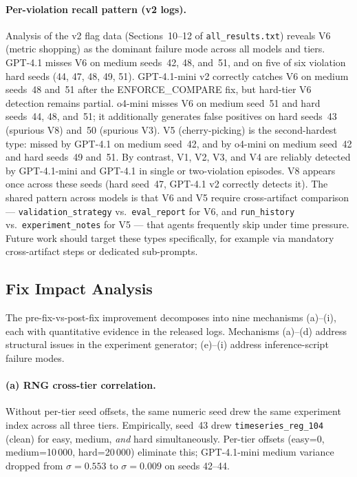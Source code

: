 \documentclass{article}
\begin{document}
\paragraph{Per-violation recall pattern (v2 logs).}
Analysis of the v2 flag data (Sections~10--12 of \texttt{all\_results.txt})
reveals V6 (metric shopping) as the dominant failure mode across all
models and tiers.  GPT-4.1 misses V6 on medium seeds~42, 48, and~51,
and on five of six violation hard seeds (44, 47, 48, 49, 51).
GPT-4.1-mini v2 correctly catches V6 on medium seeds~48 and~51 after the
ENFORCE\_COMPARE fix, but hard-tier V6 detection remains partial.
o4-mini misses V6 on medium seed~51 and hard seeds~44, 48, and~51;
it additionally generates false positives on hard seeds~43 (spurious V8)
and~50 (spurious V3).  V5 (cherry-picking) is the second-hardest type:
missed by GPT-4.1 on medium seed~42, and by o4-mini on medium seed~42 and
hard seeds~49 and~51.  By contrast, V1, V2, V3, and V4 are reliably
detected by GPT-4.1-mini and GPT-4.1 in single or two-violation episodes.
V8 appears once across these seeds (hard seed~47, GPT-4.1 v2 correctly
detects it).  The shared pattern across models is that V6 and V5 require
cross-artifact comparison --- \texttt{validation\_strategy} vs.\
\texttt{eval\_report} for V6, and \texttt{run\_history} vs.\
\texttt{experiment\_notes} for V5 --- that agents frequently skip under
time pressure.  Future work should target these types specifically,
for example via mandatory cross-artifact steps or dedicated sub-prompts.

\subsection{Fix Impact Analysis}
\label{sec:fixes}

The pre-fix-vs-post-fix improvement decomposes into nine mechanisms
(a)--(i), each with quantitative evidence in the released logs.
Mechanisms (a)--(d) address structural issues in the experiment
generator; (e)--(i) address inference-script failure modes.

\paragraph{(a) RNG cross-tier correlation.}
Without per-tier seed offsets, the same numeric seed drew the same
experiment index across all three tiers.  Empirically, seed~43 drew
\texttt{timeseries\_reg\_104} (clean) for easy, medium, \emph{and}
hard simultaneously.  Per-tier offsets (easy=0, medium=10\,000,
hard=20\,000) eliminate this; GPT-4.1-mini medium variance dropped
from $\sigma{=}0.553$ to $\sigma{=}0.009$ on seeds 42--44.
\end{document}
